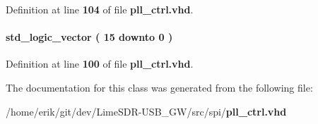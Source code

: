 Definition at line {\bf 104} of file {\bf pll\+\_\+ctrl.\+vhd}.

\paragraph[{pllrst\+\_\+start\+\_\+vect}]{ {\bfseries \textcolor{comment}{std\+\_\+logic\+\_\+vector}\textcolor{vhdlchar}{ }\textcolor{vhdlchar}{(}\textcolor{vhdlchar}{ }\textcolor{vhdlchar}{ } \textcolor{vhdldigit}{15} \textcolor{vhdlchar}{ }\textcolor{keywordflow}{downto}\textcolor{vhdlchar}{ }\textcolor{vhdlchar}{ } \textcolor{vhdldigit}{0} \textcolor{vhdlchar}{ }\textcolor{vhdlchar}{)}\textcolor{vhdlchar}{ }} \hspace{0.3cm}{\ttfamily [Signal]}}\label{classpll__ctrl_1_1arch_ac5e4616891d7385851e2f37e23dc2d29}


Definition at line {\bf 100} of file {\bf pll\+\_\+ctrl.\+vhd}.



The documentation for this class was generated from the following file\+:\begin{DoxyCompactItemize}
\item 
/home/erik/git/dev/\+Lime\+S\+D\+R-\/\+U\+S\+B\+\_\+\+G\+W/src/spi/{\bf pll\+\_\+ctrl.\+vhd}\end{DoxyCompactItemize}

